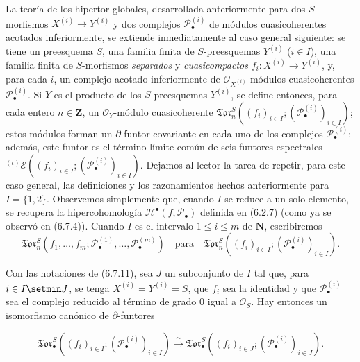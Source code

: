\begin{env}[6.7.11]
\label{III.6.7.11}
La teoría de los hipertor globales, desarrollada anteriormente para dos
$S$-morfismos $X^{(i)}\to Y^{(i)}$ y dos complejos
$\mathscr P_\bullet^{(i)}$ de módulos cuasicoherentes acotados inferiormente,
se extiende inmediatamente al caso general siguiente: se tiene un preesquema
$S$, una familia finita de $S$-preesquemas $Y^{(i)}$ ($i\in I$), una familia
finita de $S$-morfismos \emph{separados} y \emph{cuasicompactos}
$f_i:X^{(i)}\to Y^{(i)}$, y, para cada $i$, un complejo acotado inferiormente
de $\mathscr O_{X^{(i)}}$-módulos cuasicoherentes
$\mathscr P_\bullet^{(i)}$. Si $Y$ es el producto de los $S$-preesquemas
$Y^{(i)}$, se define entonces, para cada entero $n\in\mathbf Z$, un
$\mathscr O_Y$-módulo cuasicoherente
$\mathfrak{Tor}_n^S((f_i)_{i\in I};
(\mathscr P_\bullet^{(i)})_{i\in I})$;
estos módulos forman un $\partial$-funtor covariante en cada uno de los
complejos $\mathscr P_\bullet^{(i)}$; además, este funtor es el término límite
común de seis funtores espectrales
${}^{(t)}\mathscr E((f_i)_{i\in I};(\mathscr P_\bullet^{(i)})_{i\in I})$.
Dejamos al lector la tarea de repetir, para este caso general, las definiciones
y los razonamientos hechos anteriormente para $I=\{1,2\}$. Observemos
simplemente que, cuando $I$ se reduce a un solo elemento, se recupera la
hipercohomología $\mathscr H^\bullet(f,\mathscr P_\bullet)$ definida en
(6.2.7) (como ya se observó en (6.7.4)). Cuando $I$ es el intervalo
$1\leq i\leq m$ de $\mathbf N$, escribiremos
\label{III.6.7.11.2}
\[
  \mathfrak{Tor}_n^S
  (f_1,\ldots,f_m;
   \mathscr P_\bullet^{(1)},\ldots,\mathscr P_\bullet^{(m)})
  \quad\text{para}\quad
  \mathfrak{Tor}_n^S
  ((f_i)_{i\in I};(\mathscr P_\bullet^{(i)})_{i\in I}).
\]
\end{env}

\begin{proposition}[6.7.12]
\label{III.6.7.12}
Con las notaciones de (6.7.11), sea $J$ un subconjunto de $I$ tal que, para
$i\in I\setmin J$, se tenga $X^{(i)}=Y^{(i)}=S$, que $f_i$ sea la identidad y que
$\mathscr P_\bullet^{(i)}$ sea el complejo reducido al término de grado $0$
igual a $\mathscr O_S$. Hay entonces un isomorfismo canónico de
$\partial$-funtores

\label{III.6.7.12.1}
\[
  \mathfrak{Tor}_\bullet^S
  ((f_i)_{i\in I};(\mathscr P_\bullet^{(i)})_{i\in I})
  \xrightarrow{\sim}
  \mathfrak{Tor}_\bullet^S
  ((f_i)_{i\in J};(\mathscr P_\bullet^{(i)})_{i\in J}).
  \tag{6.7.12.1}\label{III.6.7.12.1.fr}
\]

\end{proposition}

